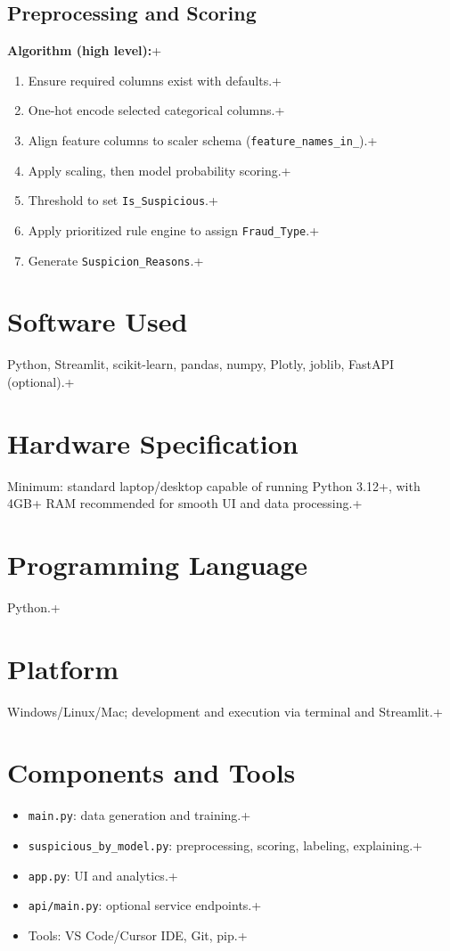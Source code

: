 \documentclass[12pt,a4paper]{report}
\begin{document}
\subsection{Preprocessing and Scoring}
\textbf{Algorithm (high level):}\n+\begin{enumerate}
  \item Ensure required columns exist with defaults.\n+  \item One-hot encode selected categorical columns.\n+  \item Align feature columns to scaler schema (\texttt{feature\_names\_in\_}).\n+  \item Apply scaling, then model probability scoring.\n+  \item Threshold to set \texttt{Is\_Suspicious}.\n+  \item Apply prioritized rule engine to assign \texttt{Fraud\_Type}.\n+  \item Generate \texttt{Suspicion\_Reasons}.\n+\end{enumerate}

\section{Software Used}
Python, Streamlit, scikit-learn, pandas, numpy, Plotly, joblib, FastAPI (optional).\n+
\section{Hardware Specification}
Minimum: standard laptop/desktop capable of running Python 3.12+, with 4GB+ RAM recommended for smooth UI and data processing.\n+
\section{Programming Language}
Python.\n+
\section{Platform}
Windows/Linux/Mac; development and execution via terminal and Streamlit.\n+
\section{Components and Tools}
\begin{itemize}
  \item \texttt{main.py}: data generation and training.\n+  \item \texttt{suspicious\_by\_model.py}: preprocessing, scoring, labeling, explaining.\n+  \item \texttt{app.py}: UI and analytics.\n+  \item \texttt{api/main.py}: optional service endpoints.\n+  \item Tools: VS Code/Cursor IDE, Git, pip.\n+\end{itemize}
\end{document}
